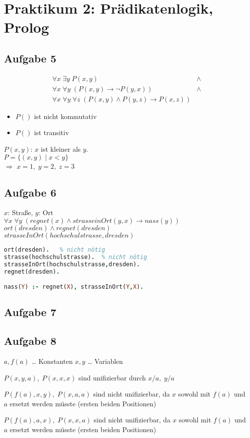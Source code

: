 \documentclass{scrreprt}
\begin{document}
\chapter{Praktikum 2: Prädikatenlogik, Prolog}
\section{Aufgabe 5}
\begin{align*}
&\forall x \;\exists y \;P(x,y) &\wedge&\\
&\forall x \; \forall y \; (P(x,y) \to \neg P(y,x)) &\wedge&\\
&\forall x \; \forall y \; \forall z \; (P(x,y) \wedge P(y,z) \to P(x,z))&&
\end{align*}
\begin{itemize}
\item $P()$ ist nicht kommutativ
\item $P()$ ist transitiv
\end{itemize}
$P(x,y)$: $x$ ist kleiner als $y$.\\
$P=\{(x,y) \;|\; x< y\}$\\
$\Rightarrow$ $x=1,\; y=2,\; z=3$

\section{Aufgabe 6}
$x$: Straße, $y$: Ort\\
$\forall x \; \forall y \; ( regnet(x) \wedge strasseinOrt(y,x) \to nass(y) )$\bigskip\\
$ort(dresden) \wedge regnet(dresden) $\\
$strasseInOrt(hochschulstrasse,dresden)$

\begin{lstlisting}[language=Prolog]
ort(dresden).	% nicht nötig
strasse(hochschulstrasse).	% nicht nötig
strasseInOrt(hochschulstrasse,dresden).
regnet(dresden).

nass(Y) :- regnet(X), strasseInOrt(Y,X).
\end{lstlisting}

\section{Aufgabe 7}


\section{Aufgabe 8}
$a,f(a)$ … Konstanten
$x,y$ … Variablen
\begin{anumerate}
\item $P(x,y,a),\; P(x,x,x)$ sind unifizierbar durch $x/a,\; y/a$
\item $P(f(a),x,y),\; P(x,a,a)$ sind nicht unifizierbar, da $x$ sowohl mit $f(a)$ und $a$ ersetzt werden müsste (ersten beiden Positionen)
\item $P(f(a),a,x),\; P(x,x,a)$ sind nicht unifizierbar,  da $x$ sowohl mit $f(a)$ und $a$ ersetzt werden müsste (ersten beiden Positionen)
\end{anumerate}
\end{document}
